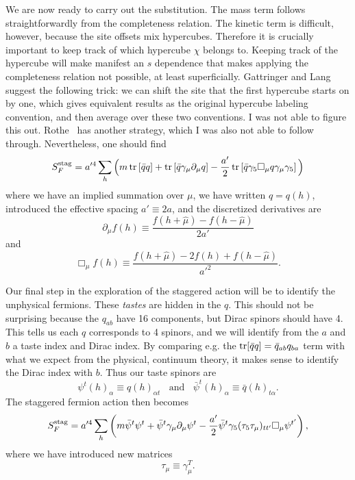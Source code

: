 We are now ready to carry out the substitution. The mass term follows
straightforwardly from the completeness relation. The kinetic term is
difficult, however, because the site offsets mix hypercubes. Therefore
it is crucially important to keep track of which hypercube $\chi$
belongs to. Keeping track of the hypercube will make manifest an $s$
dependence that makes applying the completeness relation not possible,
at least superficially. Gattringer and Lang~\cite{gattringer_quantum_2010}
suggest the following trick: we can shift the site that the first
hypercube starts on by one, which gives equivalent results as the
original hypercube labeling convention, and then average over these
two conventions. I was not able to figure this out. 
Rothe~\cite{rothe_lattice_2005} has another strategy, which I was also
not able to follow through. Nevertheless, one should find
\begin{equation}
S_F^{\rm stag}=a'^4\sum_h\Big(m\tr\left[\bar{q}q\right]
+\tr\left[\bar{q}\gamma_\mu\partial_\mu q\right]
-\frac{a'}{2}\tr\left[\bar{q}\gamma_5\Box_\mu q\gamma_\mu\gamma_5\right]\Big)
\end{equation}
where we have an implied summation over $\mu$, we have written
$q=q(h)$, introduced the effective spacing $a'\equiv2a$, and 
the discretized derivatives are
\begin{equation}
  \partial_\mu f(h)\equiv\frac{f(h+\hat{\mu})-f(h-\hat{\mu})}{2a'}
\end{equation}
and
\begin{equation}
  \Box_\mu f(h)\equiv\frac{f(h+\hat{\mu})-2f(h)+f(h-\hat{\mu})}{a'^2}.
\end{equation}

Our final step in the exploration of the staggered action will be to
identify the unphysical fermions. These {\it tastes} are hidden in
the $q$. This should not be surprising because the $q_{ab}$ have 16
components, but Dirac spinors should have 4. This
tells us each $q$ corresponds to 4 spinors, and we will identify from
the $a$ and $b$ a taste index and Dirac index.
By comparing e.g. the $\tr[\bar{q}q]=\bar{q}_{ab}q_{ba}$ term with
what we expect from the physical, continuum theory, it makes sense
to identify the Dirac index with $b$. Thus our taste spinors are
\begin{equation}
  \psi^{t}(h)_\alpha\equiv q(h)_{\alpha t}~~~~\text{and}~~~~
  \bar{\psi}^{t}(h)_\alpha\equiv \bar{q}(h)_{t\alpha}.
\end{equation}
The staggered fermion action then becomes
\begin{equation}\label{eq:staggPhys}
S_F^{\rm stag}=a'^4\sum_h\left(
m\bar{\psi}^{t}\psi^{t}
+\bar{\psi}^{t}\gamma_\mu\partial_\mu\psi^{t}
-\frac{a'}{2}\bar{\psi}^{t}\gamma_5(\tau_5\tau_\mu)_{tt'}\Box_\mu\psi^{t'}
\right),
\end{equation}
where we have introduced new matrices
\begin{equation}
\tau_\mu\equiv\gamma_\mu^T.
\end{equation}

